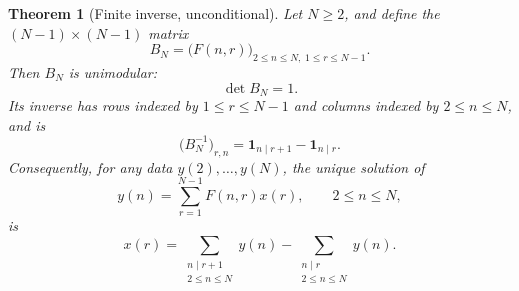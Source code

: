 \documentclass[11pt]{amsart}
\numberwithin{equation}{section}
\theoremstyle{plain}
\newtheorem{theorem}{Theorem}[section]
\theoremstyle{definition}
\theoremstyle{remark}
\newcommand{\one}{\mathbf 1}
\newcommand{\Fsurf}{F}
\begin{document}
\begin{theorem}[Finite inverse, unconditional]
\label{thm:finite_inverse}
Let \(N\ge2\), and define the \((N-1)\times(N-1)\) matrix
\begin{equation}
B_N=\bigl(\Fsurf(n,r)\bigr)_{2\le n\le N,\;1\le r\le N-1}.
\label{eq:BN_def}
\end{equation}
Then \(B_N\) is unimodular:
\begin{equation}
\det B_N=1.
\label{eq:BN_det}
\end{equation}
Its inverse has rows indexed by \(1\le r\le N-1\) and columns indexed by \(2\le n\le N\), and is
\begin{equation}
\bigl(B_N^{-1}\bigr)_{r,n}=\one_{n\mid r+1}-\one_{n\mid r}.
\label{eq:BN_inverse}
\end{equation}
Consequently, for any data \(y(2),\ldots,y(N)\), the unique solution of
\begin{equation}
y(n)=\sum_{r=1}^{N-1}\Fsurf(n,r)x(r),
\qquad 2\le n\le N,
\label{eq:finite_system}
\end{equation}
is
\begin{equation}
x(r)=\sum_{\substack{n\mid r+1\\2\le n\le N}}y(n)-\sum_{\substack{n\mid r\\2\le n\le N}}y(n).
\label{eq:finite_solution}
\end{equation}
\end{theorem}
\end{document}
